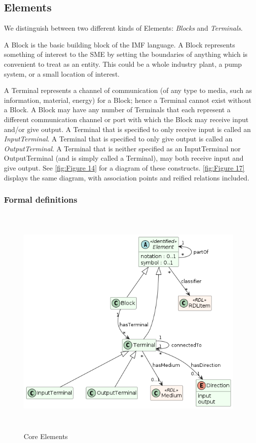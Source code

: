 \subsection{Elements}
We distinguish between two different kinds of Elements: \emph{Blocks} and
\emph{Terminals}.

A Block is the basic building block of the IMF language. A Block represents something of interest to the SME by
setting the boundaries of anything which is convenient to treat as an entity. This could be a whole industry plant, a
pump system, or a small location of interest.

A Terminal represents a channel of communication (of any type to media, such as information, material, energy) for a
Block; hence a Terminal cannot exist without a Block. A Block may have any number of Terminals that each represent a different communication channel or port with which the
Block may receive input and/or give output. A Terminal that is specified to only receive input is called an
\emph{InputTerminal}. A Terminal that is specified to only give output is called an \emph{OutputTerminal}. A
Terminal that is neither specified as an InputTerminal nor OutputTerminal (and is simply called a Terminal), may both
receive input and give output. See \autoref{fig:Figure 14} for a diagram of these constructs. \autoref{fig:Figure 17} displays the same diagram,
with association points and reified relations included.

\subsubsection{Formal definitions}


\begin{figure}[htb]\includegraphics[width=5.48958in,height=4.55178in]{img/IMFmanual-img033.png}
  \caption{Core Elements}
  \label{fig:Figure 14}
\end{figure}

